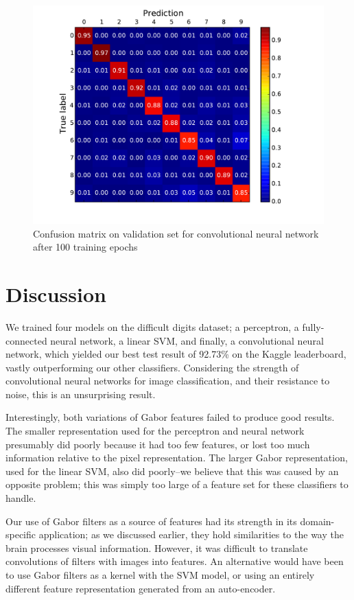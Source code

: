 \documentclass{acm_proc_article-sp}
\begin{document}
\begin{figure}[h!]
	\centering
	\includegraphics[width=\linewidth]{convnet_confusion.pdf}
  	\caption{Confusion matrix on validation set for convolutional neural network after 100 training epochs}
  	\label{fig:convnet-confusion}
\end{figure}


\section{Discussion}%
We trained four models on the difficult digits dataset; a perceptron, a fully-connected neural network, a linear SVM, and finally, a convolutional neural network, which yielded our best test result of 92.73\% on the Kaggle leaderboard, vastly outperforming our other classifiers. Considering the strength of convolutional neural networks for image classification, and their resistance to noise, this is an unsurprising result.

Interestingly, both variations of Gabor features failed to produce good results. The smaller representation used for the perceptron and neural network presumably did poorly because it had too few features, or lost too much information relative to the pixel representation. The larger Gabor representation, used for the linear SVM, also did poorly--we believe that this was caused by an opposite problem; this was simply too large of a feature set for these classifiers to handle.

Our use of Gabor filters as a source of features had its strength in its domain-specific application; as we discussed earlier, they hold similarities to the way the brain processes visual information. However, it was difficult to translate convolutions of filters with images into features. An alternative would have been to use Gabor filters as a kernel with the SVM model\cite{Sabri}, or using an entirely different feature representation generated from an auto-encoder.
\end{document}
